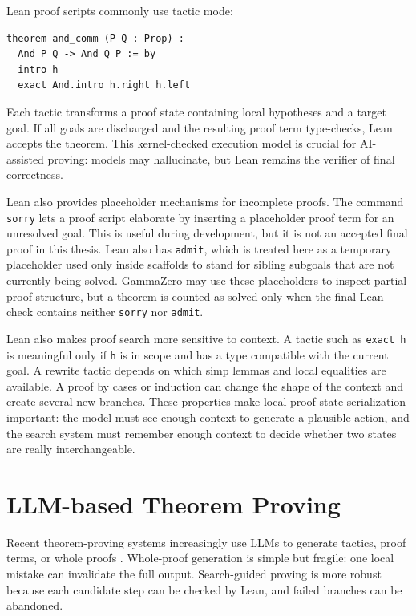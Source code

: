 \documentclass[en]{uet_awesome_thesis/uet-awesome-thesis}
\begin{document}
Lean proof scripts commonly use tactic mode:
\begin{verbatim}
theorem and_comm (P Q : Prop) :
  And P Q -> And Q P := by
  intro h
  exact And.intro h.right h.left
\end{verbatim}

Each tactic transforms a proof state containing local hypotheses and a target goal. If all goals are discharged and the resulting proof term type-checks, Lean accepts the theorem. This kernel-checked execution model is crucial for AI-assisted proving: models may hallucinate, but Lean remains the verifier of final correctness.

Lean also provides placeholder mechanisms for incomplete proofs. The command
\texttt{sorry} lets a proof script elaborate by inserting a placeholder proof term
for an unresolved goal. This is useful during development, but it is not an
accepted final proof in this thesis. Lean also has \texttt{admit}, which is treated
here as a temporary placeholder used only inside scaffolds to stand for sibling
subgoals that are not currently being solved. GammaZero may use these placeholders
to inspect partial proof structure, but a theorem is counted as solved only when
the final Lean check contains neither \texttt{sorry} nor \texttt{admit}.

Lean also makes proof search more sensitive to context. A tactic such as \texttt{exact h} is meaningful
only if \texttt{h} is in scope and has a type compatible with the current goal. A rewrite tactic depends on
which simp lemmas and local equalities are available. A proof by cases or induction can change the shape
of the context and create several new branches. These properties make local proof-state serialization
important: the model must see enough context to generate a plausible action, and the search system must
remember enough context to decide whether two states are really interchangeable.

\section{LLM-based Theorem Proving}

Recent theorem-proving systems increasingly use LLMs to generate tactics, proof terms, or whole proofs \citep{yang2023leandojo}. Whole-proof generation is simple but fragile: one local mistake can invalidate the full output. Search-guided proving is more robust because each candidate step can be checked by Lean, and failed branches can be abandoned.
\end{document}
